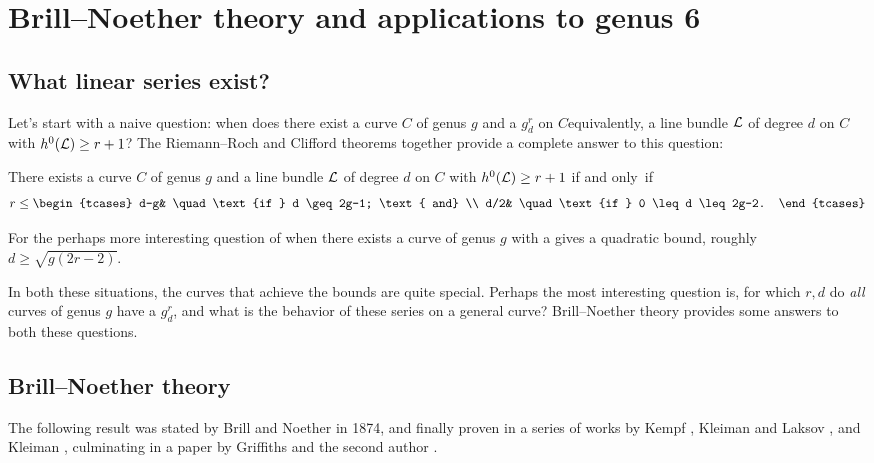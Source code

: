 

\chapter{Brill--Noether theory and applications to genus 6}\label{Brill--Noether}\label{BNChapter}

\section{What linear series exist?}

Let's start with a naive question: when does there exist a curve $C$
of genus $g$ and a $g^r_d$ on $C$\emdash equivalently, a line bundle
${\mathcal L}$ of degree $d$ on $C$ with $h^0({\mathcal L}) \geq r+1$? The 
Riemann--Roch and 
%
Clifford theorems 
%
together provide a complete answer to this question:

\begin{theorem}\label{arbitrary linear series}
There exists a curve $C$ of genus $g$ and a line bundle ${\mathcal L}$ of degree $d$ on $C$ with $h^0({\mathcal L}) \geq r+1$ if and only~if
$$
r \leq
\begin{tcases}
d-g& \quad \text{if } d \geq 2g-1; \text{ and} \\
d/2&  \quad \text{if } 0 \leq d \leq 2g-2.
\end{tcases}
$$
\end{theorem}


For the
perhaps more interesting question of when  there
exists a curve of genus $g$ with a 
%
%
%
gives a quadratic bound, roughly $d \geq
\sqrt{g(2r-2)}$. 

In both these situations, the curves that achieve the bounds are quite
special. Perhaps the most interesting question 
is, for which $r,d$ do \emph{all} curves of genus $g$ have a $g^r_d$,
and what is the
behavior of these series on a general curve? 
%
Brill--Noether theory 
provides some answers to both these questions.

\section{Brill--Noether theory}

The following result was stated by Brill and Noether in 1874, and finally
%
%
%
proven in a series of works by
Kempf
\citeyear{Kempf}, 
Kleiman and Laksov
%
%
%
%
\citeyear{MR323792,MR0357398}, 
and Kleiman \citeyear{Kleiman-special},
culminating in a paper by
Griffiths and the second author \cite{Griffiths-Harris-BN}.

